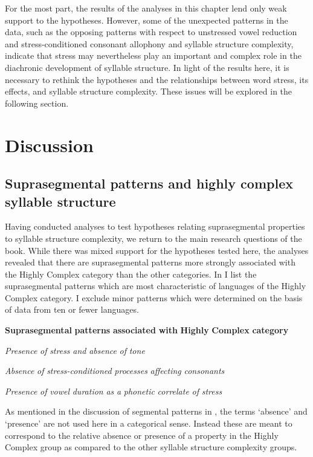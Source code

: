   For the most part, the results of the analyses in this chapter lend only weak support to the hypotheses. However, some of the unexpected patterns in the data, such as the opposing patterns with respect to unstressed vowel reduction and stress-conditioned consonant allophony and syllable structure complexity, indicate that stress may nevertheless play an important and complex role in the diachronic development of syllable structure. In light of the results here, it is necessary to rethink the hypotheses and the relationships between word stress, its effects, and syllable structure complexity. These issues will be explored in the following section.

\section{Discussion}\label{sec:5.5}
\subsection{Suprasegmental patterns and highly complex syllable structure}\label{sec:5.5.1}

  Having conducted analyses to test hypotheses relating suprasegmental properties to syllable structure complexity, we return to the main research questions of the book. While there was mixed support for the hypotheses tested here, the analyses revealed that there are suprasegmental patterns more strongly associated with the Highly Complex category than the other categories. In  I list the suprasegmental patterns which are most characteristic of languages of the Highly Complex category. I exclude minor patterns which were determined on the basis of data from ten or fewer languages.

\ea\label{ex:(5.27)}
  \textbf{Suprasegmental} \textbf{patterns} \textbf{associated} \textbf{with} \textbf{Highly} \textbf{Complex} \textbf{category}

\textit{Presence} \textit{of} \textit{stress} \textit{and} \textit{absence} \textit{of} \textit{tone}

\textit{Absence} \textit{of} \textit{stress-conditioned} \textit{processes} \textit{affecting} \textit{consonants}

\textit{Presence} \textit{of} \textit{vowel} \textit{duration} \textit{as} \textit{a} \textit{phonetic} \textit{correlate} \textit{of} \textit{stress}
\z

  As mentioned in the discussion of segmental patterns in , the terms ‘absence’ and ‘presence’ are not used here in a categorical sense. Instead these are meant to correspond to the relative absence or presence of a property in the Highly Complex group as compared to the other syllable structure complexity groups.

